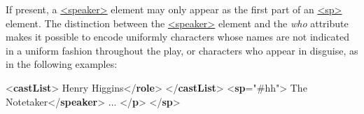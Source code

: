 If present, a \hyperref[TEI.speaker]{<speaker>} element may only appear as the first part of an \hyperref[TEI.sp]{<sp>} element. The distinction between the \hyperref[TEI.speaker]{<speaker>} element and the {\itshape who} attribute makes it possible to encode uniformly characters whose names are not indicated in a uniform fashion throughout the play, or characters who appear in disguise, as in the following examples: \par\bgroup{}\exampleFont \begin{shaded}\noindent\mbox{}{<\textbf{castList}>}\mbox{}\newline 
{}\mbox{}\newline 
\hspace*{1em}Henry Higgins{</\textbf{role}>}\mbox{}\newline 
{}\mbox{}\newline 
{</\textbf{castList}>}\mbox{}\newline 
{<\textbf{sp}\hspace*{1em}{who}="{\#hh}">}\mbox{}\newline 
{}The Notetaker{</\textbf{speaker}>}\mbox{}\newline 
{} ... {</\textbf{p}>}\mbox{}\newline 
{</\textbf{sp}>}\end{shaded}\egroup\par \noindent  \par
